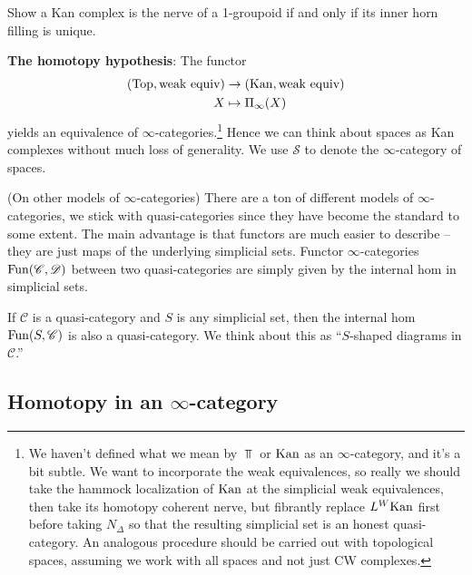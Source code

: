 \documentclass[11pt,openany]{book}
\begin{document}
\begin{exercise} Show a Kan complex is the nerve of a 1-groupoid if and only if its inner horn filling is unique.
\end{exercise}

\textbf{The homotopy hypothesis}: The functor
\begin{align*}
    (\mathrm{Top},\text{weak equiv}) &\to (\mathrm{Kan}, \text{weak equiv}) \\
    X &\mapsto \Pi_\infty(X)
\end{align*}
yields an equivalence of $\infty$-categories.\footnote{%
We haven't defined what we mean by $\Top$ or $\mathrm{Kan}$ as an $\infty$-category, and it's a bit subtle. We want to incorporate the weak equivalences, so really we should take the hammock localization of $\mathrm{Kan}$ at the simplicial weak equivalences, then take its homotopy coherent nerve, but fibrantly replace $L^W\mathrm{Kan}$ first before taking $N_\Delta$ so that the resulting simplicial set is an honest quasi-category. An analogous procedure should be carried out with topological spaces, assuming we work with all spaces and not just CW complexes.
}
Hence we can think about spaces as Kan complexes without much loss of generality. We use $\mathcal{S}$ to denote the $\infty$-category of spaces.

\begin{remark} (On other models of $\infty$-categories) There are a ton of different models of $\infty$-categories, we stick with quasi-categories since they have become the standard to some extent. The main advantage is that functors are much easier to describe -- they are just maps of the underlying simplicial sets. Functor $\infty$-categories $\mathrm{Fun}(\mathscr{C},\mathscr{D})$ between two quasi-categories are simply given by the internal hom in simplicial sets.
\end{remark}

\begin{proposition} If $\mathscr{C}$ is a quasi-category and $S$ is any simplicial set, then the internal hom $\mathrm{Fun}(S,\mathscr{C})$ is also a quasi-category. We think about this as ``$S$-shaped diagrams in $\mathscr{C}$.''
\end{proposition}



\subsection{Homotopy in an $\infty$-category}
\end{document}
